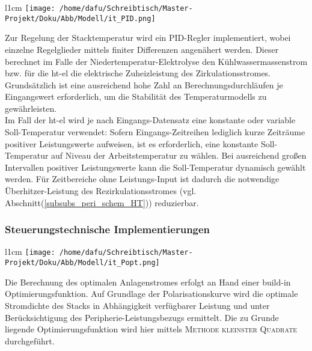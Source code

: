 \documentclass[onecolumn,10pt,titlepage]{article}
\begin{document}
\begin{wrapfigure}{l}{1cm}
	\texttt{[image: /home/dafu/Schreibtisch/Master-Projekt/Doku/Abb/Modell/it\_PID.png]}
\end{wrapfigure}
Zur Regelung der Stacktemperatur wird ein PID-Regler implementiert, wobei einzelne Regelglieder mittels finiter Differenzen angenähert werden.
Dieser berechnet im Falle der Niedertemperatur-Elektrolyse den Kühlwassermassenstrom bzw. für die \gls{ht}-\gls{el} die elektrische Zuheizleistung des Zirkulationsstromes. Grundsätzlich ist eine ausreichend hohe Zahl an Berechnungsdurchläufen je Eingangswert erforderlich, um die Stabilität des Temperaturmodells zu gewährleisten.\\ Im Fall der \gls{ht}-\gls{el} wird je nach Eingangs-Datensatz eine konstante oder variable Soll-Temperatur verwendet: Sofern Eingangs-Zeitreihen lediglich kurze Zeiträume positiver Leistungswerte aufweisen, ist es erforderlich, eine konstante Soll-Temperatur auf Niveau der Arbeitstemperatur zu wählen. Bei ausreichend großen Intervallen positiver Leistungswerte kann die Soll-Temperatur dynamisch gewählt werden. Für Zeitbereiche ohne Leistungs-Input ist dadurch die notwendige Überhitzer-Leistung des Rezirkulationsstromes (vgl. Abschnitt(\ref{subsubs_peri_schem_HT})) reduzierbar.
\newline

\subsubsection{Steuerungstechnische Implementierungen}
\label{subsubs_mod_Anlagen-strg}




\begin{wrapfigure}{l}{1cm}
	\texttt{[image: /home/dafu/Schreibtisch/Master-Projekt/Doku/Abb/Modell/it\_Popt.png]}
\end{wrapfigure} Die Berechnung des optimalen Anlagenstromes erfolgt an Hand einer build-in Optimierungsfunktion.
 Auf Grundlage der Polarisationskurve wird die optimale Stromdichte des Stacks in Abhängigkeit verfügbarer Leistung und unter Berücksichtigung des Peripherie-Leistungsbezugs ermittelt. Die zu Grunde liegende Optimierungsfunktion wird hier mittels \textsc{Methode kleinster Quadrate} durchgeführt.\\
\end{document}

